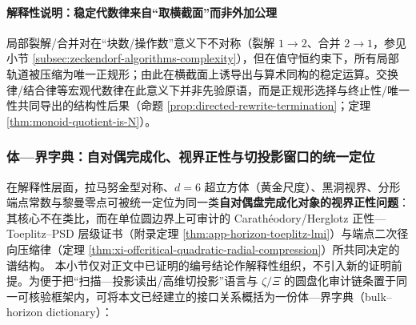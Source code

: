 \paragraph{解释性说明：稳定代数律来自“取横截面”而非外加公理}
局部裂解/合并对在“块数/操作数”意义下不对称（裂解 \(1\to 2\)、合并 \(2\to 1\)，参见小节 \ref{subsec:zeckendorf-algorithms-complexity}），但在值守恒约束下，所有局部轨道被压缩为唯一正规形；由此在横截面上诱导出与算术同构的稳定运算。交换律/结合律等宏观代数律在此意义下并非先验原语，而是正规形选择与终止性/唯一性共同导出的结构性后果（命题 \ref{prop:directed-rewrite-termination}；定理 \ref{thm:monoid-quotient-is-N}）。

\subsubsection{体—界字典：自对偶完成化、视界正性与切投影窗口的统一定位}\label{subsubsec:discussion-bulk-horizon-dictionary}
在解释性层面，拉马努金型对称、\(d=6\) 超立方体（黄金尺度）、黑洞视界、分形端点常数与黎曼零点可被统一定位为同一类\textbf{自对偶盘完成化对象的视界正性问题}：其核心不在类比，而在单位圆边界上可审计的 Carath\'eodory/Herglotz 正性—Toeplitz--PSD 层级证书（附录定理 \ref{thm:app-horizon-toeplitz-lmi}）与端点二次径向压缩律（定理 \ref{thm:xi-offcritical-quadratic-radial-compression}）所共同决定的谱结构。
本小节仅对正文中已证明的编号结论作解释性组织，不引入新的证明前提。为便于把“扫描—投影读出/高维切投影”语言与 \(\zeta/\Xi\) 的圆盘化审计链条置于同一可核验框架内，可将本文已经建立的接口关系概括为一份体—界字典（bulk–horizon dictionary）：
